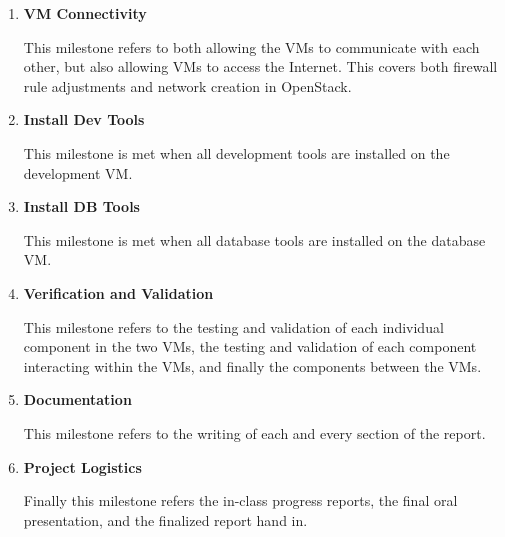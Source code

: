 \begin{enumerate}
  \item \textbf{VM Connectivity}

    This milestone refers to both allowing the VMs to communicate with
    each other, but also allowing VMs to access the Internet. This
    covers both firewall rule adjustments and network creation in
    OpenStack.

  \item \textbf{Install Dev Tools}

    This milestone is met when all development tools are installed on
    the development VM.

  \item \textbf{Install DB Tools}

    This milestone is met when all database tools are installed on the
    database VM.

  \item \textbf{Verification and Validation}

    This milestone refers to the testing and validation of each
    individual component in the two VMs, the testing and validation of
    each component interacting within the VMs, and finally the
    components between the VMs.

  \item \textbf{Documentation}

    This milestone refers to the writing of each and every section of
    the report.

  \item \textbf{Project Logistics}

    Finally this milestone refers the in-class progress reports, the
    final oral presentation, and the finalized report hand in.
\end{enumerate}
